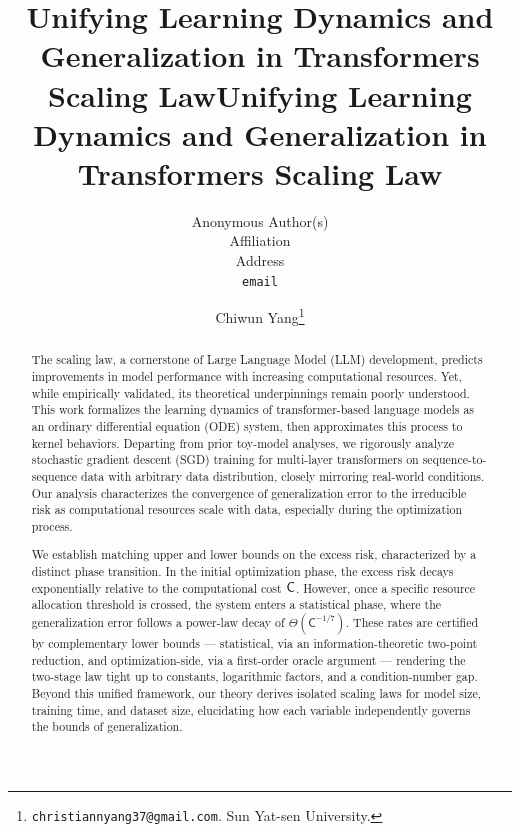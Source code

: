 \documentclass[11pt]{article}
\title{Unifying Learning Dynamics and Generalization in Transformers Scaling Law}
\author{%
  Anonymous Author(s)\\
  Affiliation\\
  Address\\
  \texttt{email}
}
\theoremstyle{plain}
\begin{document}
\ifdefined\isarxiv

\date{}


\title{Unifying Learning Dynamics and Generalization in Transformers Scaling Law
}
\author{
Chiwun Yang\thanks{ \texttt{christiannyang37@gmail.com}. Sun Yat-sen University.}
}


\maketitle
\begin{abstract}
The scaling law, a cornerstone of Large Language Model (LLM) development, predicts improvements in model performance with increasing computational resources. Yet, while empirically validated, its theoretical underpinnings remain poorly understood. This work formalizes the learning dynamics of transformer-based language models as an ordinary differential equation (ODE) system, then approximates this process to kernel behaviors. Departing from prior toy-model analyses, we rigorously analyze stochastic gradient descent (SGD) training for multi-layer transformers on sequence-to-sequence data with arbitrary data distribution, closely mirroring real-world conditions. Our analysis characterizes the convergence of generalization error to the irreducible risk as computational resources scale with data, especially during the optimization process. 

We establish matching upper and lower bounds on the excess risk, characterized by a distinct phase transition. In the initial optimization phase, the excess risk decays exponentially relative to the computational cost ${\sf C}$. However, once a specific resource allocation threshold is crossed, the system enters a statistical phase, where the generalization error follows a power-law decay of $\Theta(\mathsf{C}^{-1/7})$. These rates are certified by complementary lower bounds --- statistical, via an information-theoretic two-point reduction, and optimization-side, via a first-order oracle argument --- rendering the two-stage law tight up to constants, logarithmic factors, and a condition-number gap. Beyond this unified framework, our theory derives isolated scaling laws for model size, training time, and dataset size, elucidating how each variable independently governs the bounds of generalization.

\end{abstract}
\end{document}
